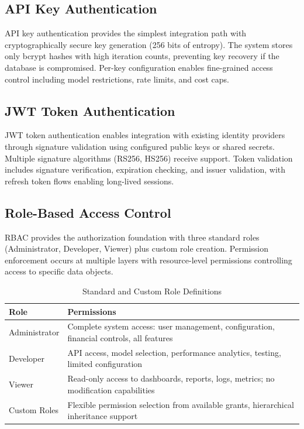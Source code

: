 \documentclass[12pt,a4paper,twoside]{report}
\begin{document}
\subsection{API Key Authentication}

API key authentication provides the simplest integration path with cryptographically secure key generation (256 bits of entropy). The system stores only bcrypt hashes with high iteration counts, preventing key recovery if the database is compromised. Per-key configuration enables fine-grained access control including model restrictions, rate limits, and cost caps.

\subsection{JWT Token Authentication}

JWT token authentication enables integration with existing identity providers through signature validation using configured public keys or shared secrets. Multiple signature algorithms (RS256, HS256) receive support. Token validation includes signature verification, expiration checking, and issuer validation, with refresh token flows enabling long-lived sessions.

\subsection{Role-Based Access Control}

RBAC provides the authorization foundation with three standard roles (Administrator, Developer, Viewer) plus custom role creation. Permission enforcement occurs at multiple layers with resource-level permissions controlling access to specific data objects.

\begin{table}[h]
\centering
\begin{tabular}{@{}p{3cm}p{8.5cm}@{}}
\toprule
\textbf{Role} & \textbf{Permissions} \\
\midrule
Administrator & Complete system access: user management, configuration, financial controls, all features \\
Developer & API access, model selection, performance analytics, testing, limited configuration \\
Viewer & Read-only access to dashboards, reports, logs, metrics; no modification capabilities \\
Custom Roles & Flexible permission selection from available grants, hierarchical inheritance support \\
\bottomrule
\end{tabular}
\caption{Standard and Custom Role Definitions}
\label{tab:rbac-roles}
\end{table}
\end{document}
